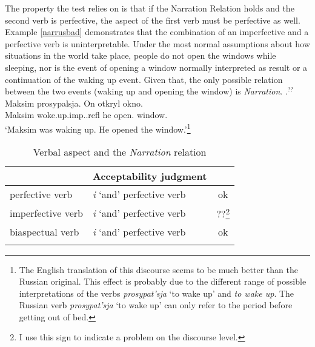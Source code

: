 The property the test relies on is that if the Narration Relation holds and the second verb is perfective, the aspect of the first verb must be perfective as well. Example \ref{narrusbad} demonstrates that the combination of an imperfective and a perfective verb is uninterpretable. Under the most normal assumptions about how situations in the world take place, people do not open the windows while sleeping, nor is the event of opening a window normally interpreted as result or a continuation of the waking up event. Given that, the only possible relation between the two events (waking up and opening the window) is \textit{Narration}.
\exg.\label{narrusbad}$^{??}$Maksim prosypalsja\textsuperscript{\IPF}. On otkryl\textsuperscript{\PF} okno.\\
Maksim woke.up.imp..refl he open. window.\\
\trans{}`Maksim was waking up. He opened the window.'\footnote{The English translation of this discourse seems to be much better than the Russian original. This effect is probably due to the different range of possible interpretations of the verbs \textit{prosypat'sja} `to wake up' and \textit{to wake up}. The Russian verb \textit{prosypat'sja} `to wake up' can only refer to the period before getting out of bed.}

\begin{table}
\caption{\label{table}Verbal aspect and the \textit{Narration} relation}
\begin{tabular}{llc}
\lsptoprule
\multicolumn{2}{c}{Verbal combination}& Acceptability judgment\\\midrule
perfective verb & \textit{i} `and' perfective verb~ & ok\hphantom{\textsuperscript{\textit{a}}}\\
imperfective verb & \textit{i} `and' perfective verb~ & ??\footnote{I use this sign to indicate a problem on the discourse level.}\\
biaspectual verb & \textit{i} `and' perfective verb~ & ok\hphantom{\textsuperscript{\textit{a}}}\\
\lspbottomrule
\end{tabular}
\end{table}

